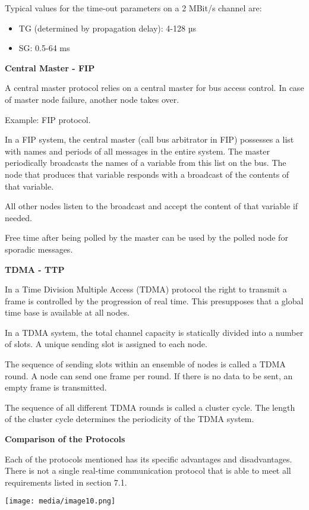 Typical values for the time-out parameters on a 2 MBit/s channel are:

\begin{itemize}
\item
  TG (determined by propagation delay): 4-128 µs
\item
  SG: 0.5-64 ms
\end{itemize}

\textbf{Central Master - FIP}

A central master protocol relies on a central master for bus access
control. In case of master node failure, another node takes over.

Example: FIP protocol.

In a FIP system, the central master (call bus arbitrator in FIP)
possesses a list with names and periods of all messages in the entire
system. The master periodically broadcasts the names of a variable from
this list on the bus. The node that produces that variable responds with
a broadcast of the contents of that variable.

All other nodes listen to the broadcast and accept the content of that
variable if needed.

Free time after being polled by the master can be used by the polled
node for sporadic messages.

\textbf{TDMA - TTP}

In a Time Division Multiple Access (TDMA) protocol the right to transmit
a frame is controlled by the progression of real time. This presupposes
that a global time base is available at all nodes.

In a TDMA system, the total channel capacity is statically divided into
a number of slots. A unique sending slot is assigned to each node.

The sequence of sending slots within an ensemble of nodes is called a
TDMA round. A node can send one frame per round. If there is no data to
be sent, an empty frame is transmitted.

The sequence of all different TDMA rounds is called a cluster cycle. The
length of the cluster cycle determines the periodicity of the TDMA
system.

\textbf{Comparison of the Protocols}

Each of the protocols mentioned has its specific advantages and
disadvantages. There is not a single real-time communication protocol
that is able to meet all requirements listed in section 7.1.

\texttt{[image: media/image10.png]}

